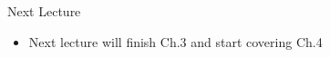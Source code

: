 \documentclass[aspectratio=1610]{beamer}
\begin{document}

\begin{frame}[wide]{Next Lecture}
	\begin{itemize}
		\item Next lecture will finish Ch.3 and start covering Ch.4
	\end{itemize}
\end{frame}
\end{document}
